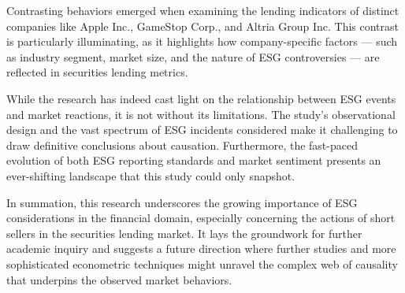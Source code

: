 Contrasting behaviors emerged when examining the lending indicators of distinct companies like Apple Inc., GameStop Corp., and Altria Group Inc. This contrast is particularly illuminating, as it highlights how company-specific factors — such as industry segment, market size, and the nature of ESG controversies — are reflected in securities lending metrics.

While the research has indeed cast light on the relationship between ESG events and market reactions, it is not without its limitations. The study's observational design and the vast spectrum of ESG incidents considered make it challenging to draw definitive conclusions about causation. Furthermore, the fast-paced evolution of both ESG reporting standards and market sentiment presents an ever-shifting landscape that this study could only snapshot.

In summation, this research underscores the growing importance of ESG considerations in the financial domain, especially concerning the actions of short sellers in the securities lending market. It lays the groundwork for further academic inquiry and suggests a future direction where further studies and more sophisticated econometric techniques might unravel the complex web of causality that underpins the observed market behaviors.


